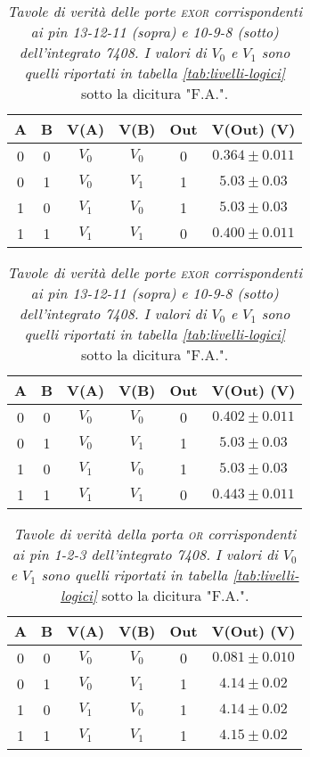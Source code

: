 \begin{table}[H]
  \centering
  \begin{subtable}[H]{0.5\textwidth}
    \centering
    \begin{tabular}[t]{c  c | c  c | c  c}
      \hline
      A & B & V(A) & V(B) & Out & V(Out) (V)\\
      \hline
      0 & 0 & $V_{0}$ & $V_{0}$ & 0 & $0.364 \pm 0.011$ \\
      0 & 1 & $V_{0}$ & $V_{1}$ & 1 & $5.03 \pm 0.03$ \\
      1 & 0 & $V_{1}$ & $V_{0}$ & 1 & $5.03 \pm 0.03$ \\
      1 & 1 & $V_{1}$ & $V_{1}$ & 0 & $0.400 \pm 0.011$ \\
      \hline
    \end{tabular}
  \end{subtable}

  \vspace{.5cm}

  \begin{subtable}[H]{0.5\textwidth}
    \centering
    \begin{tabular}[t]{c  c | c  c | c  c}
      \hline
      A & B & V(A) & V(B) & Out & V(Out) (V)\\
      \hline
      0 & 0 & $V_{0}$ & $V_{0}$ & 0 & $0.402 \pm 0.011$ \\
      0 & 1 & $V_{0}$ & $V_{1}$ & 1 & $5.03 \pm 0.03$ \\
      1 & 0 & $V_{1}$ & $V_{0}$ & 1 & $5.03 \pm 0.03$ \\
      1 & 1 & $V_{1}$ & $V_{1}$ & 0 & $0.443 \pm 0.011$ \\
      \hline
    \end{tabular}
  \end{subtable}
  \caption{\emph{Tavole di verità delle porte \textsc{exor} corrispondenti ai pin 13-12-11 (sopra) e 10-9-8 (sotto) dell'integrato 7408. I valori di $V_{0}$ e $V_{1}$ sono quelli riportati in tabella \ref{tab:livelli-logici}} sotto la dicitura "F.A.".}
  \label{tab:exor-fulladder}
\end{table}

\begin{table}[H]
  \centering
  \begin{tabular}[t]{c  c | c  c | c  c}
    \hline
    A & B & V(A) & V(B) & Out & V(Out) (V)\\
    \hline
    0 & 0 & $V_{0}$ & $V_{0}$ & 0 & $0.081 \pm 0.010$ \\
    0 & 1 & $V_{0}$ & $V_{1}$ & 1 & $4.14 \pm 0.02$ \\
    1 & 0 & $V_{1}$ & $V_{0}$ & 1 & $4.14 \pm 0.02$ \\
    1 & 1 & $V_{1}$ & $V_{1}$ & 1 & $4.15 \pm 0.02$ \\
    \hline
  \end{tabular}
  \caption{\emph{Tavole di verità della porta \textsc{or} corrispondenti ai pin 1-2-3 dell'integrato 7408. I valori di $V_{0}$ e $V_{1}$ sono quelli riportati in tabella \ref{tab:livelli-logici}} sotto la dicitura "F.A.".}
  \label{tab:or-fulladder}
\end{table}

